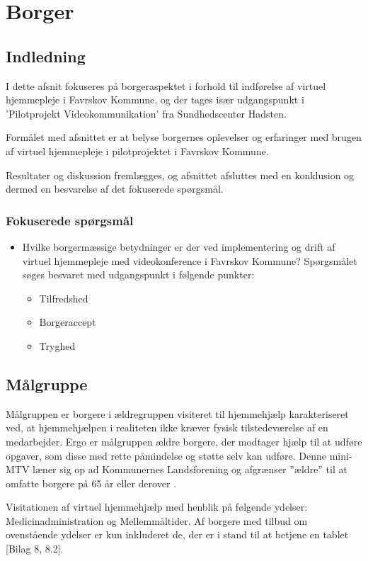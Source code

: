 \chapter{Borger}

\section{Indledning}
I dette afsnit fokuseres på borgeraspektet i forhold til indførelse af virtuel hjemmepleje i Favrskov Kommune, og der tages især udgangspunkt i ’Pilotprojekt Videokommunikation’ fra Sundhedscenter Hadsten. 

Formålet med afsnittet er at belyse borgernes oplevelser og erfaringer med brugen af virtuel hjemmepleje i pilotprojektet i Favrskov Kommune. 

Resultater og diskussion fremlægges, og afsnittet afsluttes med en konklusion og dermed en besvarelse af det fokuserede spørgsmål.



\subsection{Fokuserede spørgsmål}
\begin{itemize}
	\item Hvilke borgermæssige betydninger er der ved implementering og drift af virtuel hjemmepleje med videokonference i Favrskov Kommune? Spørgsmålet søges besvaret med udgangspunkt i følgende punkter:
	\begin{itemize}
	\item Tilfredshed
	\item Borgeraccept
	\item Tryghed
\end{itemize}
\end{itemize}

\section{Målgruppe}
Målgruppen er borgere i ældregruppen visiteret til hjemmehjælp karakteriseret ved, at hjemmehjælpen i realiteten ikke kræver fysisk tilstedeværelse af en medarbejder. Ergo er målgruppen ældre borgere, der modtager hjælp til at udføre opgaver, som disse med rette påmindelse og støtte selv kan udføre. Denne mini-MTV læner sig op ad Kommunernes Landsforening og afgrænser ”ældre” til at omfatte borgere på 65 år eller derover \cite{KL}. 

Visitationen af virtuel hjemmehjælp med henblik på følgende ydelser: Medicinadministration og Mellemmåltider. Af borgere med tilbud om ovenstående ydelser er kun inkluderet de, der er i stand til at betjene en tablet [Bilag 8, 8.2].

